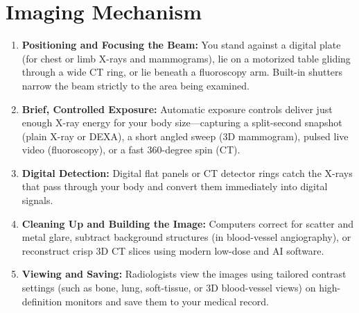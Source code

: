\section{Imaging Mechanism}
\begin{enumerate}
  \item \textbf{Positioning and Focusing the Beam:} You stand against a digital plate (for chest or limb X-rays and mammograms), lie on a motorized table gliding through a wide CT ring, or lie beneath a fluoroscopy arm. Built-in shutters narrow the beam strictly to the area being examined.
  \item \textbf{Brief, Controlled Exposure:} Automatic exposure controls deliver just enough X-ray energy for your body size---capturing a split-second snapshot (plain X-ray or DEXA), a short angled sweep (3D mammogram), pulsed live video (fluoroscopy), or a fast 360-degree spin (CT).
  \item \textbf{Digital Detection:} Digital flat panels or CT detector rings catch the X-rays that pass through your body and convert them immediately into digital signals.
  \item \textbf{Cleaning Up and Building the Image:} Computers correct for scatter and metal glare, subtract background structures (in blood-vessel angiography), or reconstruct crisp 3D CT slices using modern low-dose and AI software.
  \item \textbf{Viewing and Saving:} Radiologists view the images using tailored contrast settings (such as bone, lung, soft-tissue, or 3D blood-vessel views) on high-definition monitors and save them to your medical record.
\end{enumerate}

